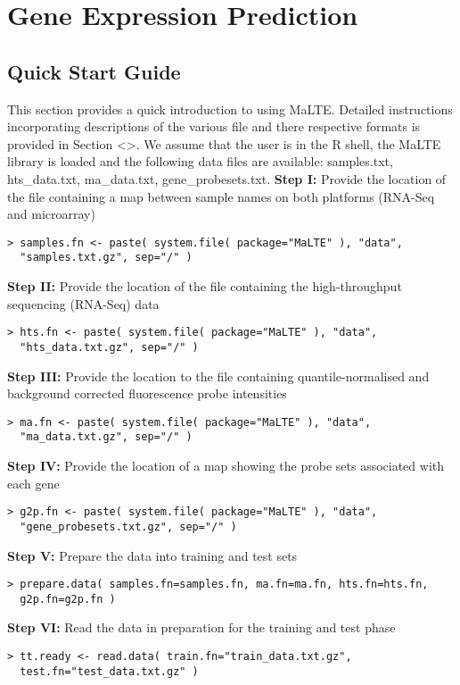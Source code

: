 \documentclass[a4paper,12pt]{article}
\begin{document}
\section{Gene Expression Prediction}
\subsection{Quick Start Guide}
This section provides a quick introduction to using MaLTE. Detailed instructions incorporating descriptions of the various file and there respective formats is provided in Section \textless\textgreater. We assume that the user is in the R shell, the MaLTE library is loaded and the following data files are available: samples.txt, hts\_data.txt, ma\_data.txt, gene\_probesets.txt.
\textbf{Step I:} Provide the location of the file containing a map between sample names on both platforms (RNA-Seq and microarray)
\begin{verbatim}
> samples.fn <- paste( system.file( package="MaLTE" ), "data", 
  "samples.txt.gz", sep="/" )
\end{verbatim}
\textbf{Step II:} Provide the location of the file containing the high-throughput sequencing (RNA-Seq) data
\begin{verbatim}
> hts.fn <- paste( system.file( package="MaLTE" ), "data", 
  "hts_data.txt.gz", sep="/" )
\end{verbatim}
\textbf{Step III:} Provide the location to the file containing quantile-normalised and background corrected fluorescence probe intensities
\begin{verbatim}
> ma.fn <- paste( system.file( package="MaLTE" ), "data", 
  "ma_data.txt.gz", sep="/" )
\end{verbatim}
\textbf{Step IV:} Provide the location of a map showing the probe sets associated with each gene
\begin{verbatim}
> g2p.fn <- paste( system.file( package="MaLTE" ), "data", 
  "gene_probesets.txt.gz", sep="/" )
\end{verbatim}
\textbf{Step V:} Prepare the data into training and test sets
\begin{verbatim}
> prepare.data( samples.fn=samples.fn, ma.fn=ma.fn, hts.fn=hts.fn, 
  g2p.fn=g2p.fn )
\end{verbatim}
\textbf{Step VI:} Read the data in preparation for the training and test phase
\begin{verbatim}
> tt.ready <- read.data( train.fn="train_data.txt.gz", 
  test.fn="test_data.txt.gz" )
\end{verbatim}
\end{document}
